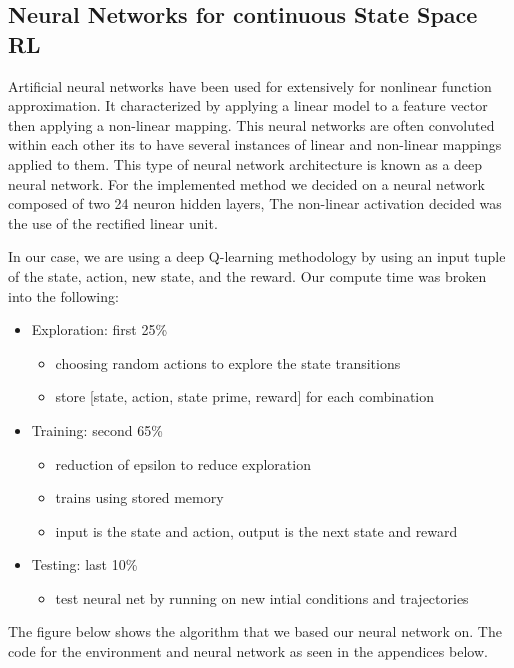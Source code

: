 \documentclass[11pt]{article} %
\begin{document}
\subsection{Neural Networks for continuous State Space RL}
Artificial neural networks have been used for extensively for nonlinear function approximation. 
It characterized by applying a linear model to a feature vector then applying a non-linear mapping.
This neural networks are often convoluted within each other its to have several instances of linear and non-linear 
mappings applied to them. This type of neural network architecture is known as a deep neural network. For the 
implemented method we decided on a neural network composed of two 24 neuron hidden layers, The non-linear activation
decided was the use of the rectified linear unit. 

In our case, we are using a deep Q-learning methodology by using an input tuple of the state, action, new state, and the reward. Our 
compute time was broken into the following:
\begin{itemize}

   \item Exploration: first 25\%
   \begin{itemize}
      \item choosing random actions to explore the state transitions
      \item store [state, action, state prime, reward] for each combination
   \end{itemize}
   
   \item Training: second 65\%
   \begin{itemize}
      \item reduction of epsilon to reduce exploration
      \item trains using stored memory
      \item input is the state and action, output is the next state and reward
   \end{itemize}
   
   \item Testing: last 10\%
   \begin{itemize}
      \item test neural net by running on new intial conditions and trajectories
   \end{itemize}
   
   \end{itemize}
   
   The figure below shows the algorithm that we based our neural network on. The code for the environment and neural network as seen in the appendices below.
   
\end{document}
